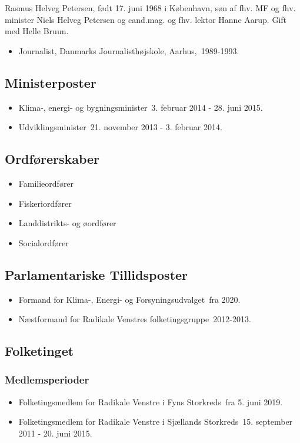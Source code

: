 \documentclass[11pt, a4paper]{awesome-cv}
\begin{document}
\makecvheader[R]
\makelettertitle
\begin{cvletter}
Rasmus Helveg Petersen, født 17. juni 1968 i København, søn af fhv. MF og fhv. minister Niels Helveg Petersen og cand.mag. og fhv. lektor Hanne Aarup. Gift med Helle Bruun.

\begin{itemize}
\item Journalist, Danmarks Journalisthøjskole, Aarhus, 1989-1993.
\end{itemize}
\subsection*{Ministerposter}
\begin{itemize}
\item Klima-, energi- og bygningsminister 3. februar 2014 - 28. juni 2015.
\item Udviklingsminister 21. november 2013 - 3. februar 2014.
\end{itemize}
\subsection*{Ordførerskaber}
\begin{itemize}
\item Familieordfører
\item Fiskeriordfører
\item Landdistrikts- og øordfører
\item Socialordfører
\end{itemize}
\subsection*{Parlamentariske Tillidsposter}
\begin{itemize}
\item Formand for Klima-, Energi- og Forsyningsudvalget fra 2020.
\item Næstformand for Radikale Venstres folketingsgruppe 2012-2013.
\end{itemize}
\subsection*{Folketinget}
\subsubsection*{Medlemsperioder}
\begin{itemize}
\item Folketingsmedlem for Radikale Venstre i Fyns Storkreds fra 5. juni 2019.
\item Folketingsmedlem for Radikale Venstre i Sjællands Storkreds 15. september 2011 - 20. juni 2015.
\end{itemize}

\end{cvletter}
\end{document}
